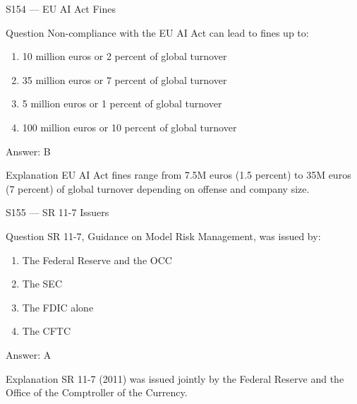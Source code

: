 \documentclass[aspectratio=169,8pt]{beamer}
\begin{document}
	\begin{frame}{S154 --- EU AI Act Fines}
		\begin{block}{Question}
			Non-compliance with the EU AI Act can lead to fines up to:
			\begin{enumerate}
				\item 10 million euros or 2 percent of global turnover
				\item 35 million euros or 7 percent of global turnover
				\item 5 million euros or 1 percent of global turnover
				\item 100 million euros or 10 percent of global turnover
			\end{enumerate}
		\end{block}
		\begin{exampleblock}{Answer: B}\end{exampleblock}
		\begin{block}{Explanation}
			EU AI Act fines range from 7.5M euros (1.5 percent) to 35M euros (7 percent) of global turnover depending on offense and company size.
		\end{block}
	\end{frame}
	
	\begin{frame}{S155 --- SR 11-7 Issuers}
		\begin{block}{Question}
			SR 11-7, Guidance on Model Risk Management, was issued by:
			\begin{enumerate}
				\item The Federal Reserve and the OCC
				\item The SEC
				\item The FDIC alone
				\item The CFTC
			\end{enumerate}
		\end{block}
		\begin{exampleblock}{Answer: A}\end{exampleblock}
		\begin{block}{Explanation}
			SR 11-7 (2011) was issued jointly by the Federal Reserve and the Office of the Comptroller of the Currency.
		\end{block}
	\end{frame}
	
\end{document}
